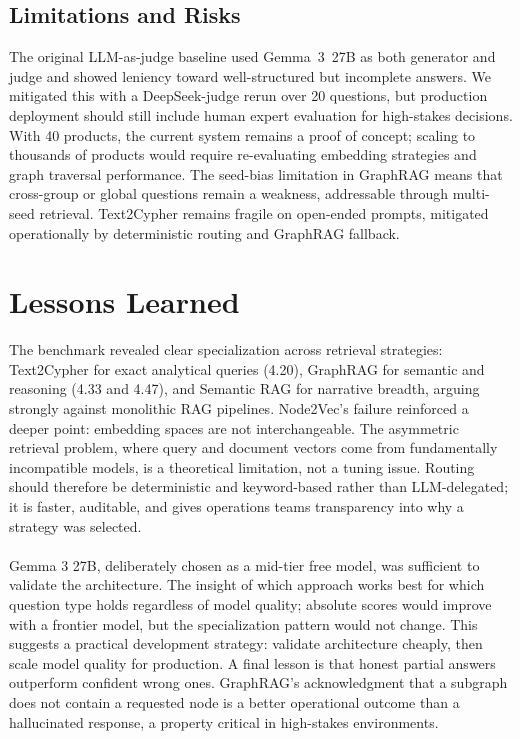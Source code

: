 \documentclass[11pt,a4paper]{article}
\begin{document}
\subsection{Limitations and Risks}

The original LLM-as-judge baseline used Gemma~3~27B as both generator and judge and showed leniency toward well-structured but incomplete answers. We mitigated this with a DeepSeek-judge rerun over 20 questions, but production deployment should still include human expert evaluation for high-stakes decisions. With 40 products, the current system remains a proof of concept; scaling to thousands of products would require re-evaluating embedding strategies and graph traversal performance. The seed-bias limitation in GraphRAG means that cross-group or global questions remain a weakness, addressable through multi-seed retrieval. Text2Cypher remains fragile on open-ended prompts, mitigated operationally by deterministic routing and GraphRAG fallback.

\section{Lessons Learned}

The benchmark revealed clear specialization across retrieval strategies: Text2Cypher for exact analytical queries (4.20), GraphRAG for semantic and reasoning (4.33 and 4.47), and Semantic RAG for narrative breadth, arguing strongly against monolithic RAG pipelines. Node2Vec's failure reinforced a deeper point: embedding spaces are not interchangeable. The asymmetric retrieval problem, where query and document vectors come from fundamentally incompatible models, is a theoretical limitation, not a tuning issue. Routing should therefore be deterministic and keyword-based rather than LLM-delegated; it is faster, auditable, and gives operations teams transparency into why a strategy was selected.
\\ \\
Gemma 3 27B, deliberately chosen as a mid-tier free model, was sufficient to validate the architecture. The insight of which approach works best for which question type holds regardless of model quality; absolute scores would improve with a frontier model, but the specialization pattern would not change. This suggests a practical development strategy: validate architecture cheaply, then scale model quality for production. A final lesson is that honest partial answers outperform confident wrong ones. GraphRAG's acknowledgment that a subgraph does not contain a requested node is a better operational outcome than a hallucinated response, a property critical in high-stakes environments.
\end{document}
